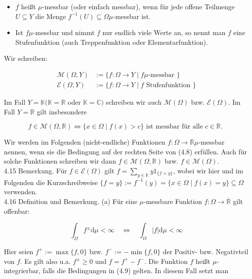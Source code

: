 \documentclass[10pt, letterpaper]{article}
\begin{document}
\begin{itemize}
  \item $f$ heißt $\mu$-messbar (oder einfach messbar), wenn für jede offene Teilmenge $U \subseteq Y$ die Menge $f^{-1}(U) \subseteq \Omega \mu$-messbar ist.
  \item Ist $f \mu$-messbar und nimmt $f$ nur endlich viele Werte an, so nennt man $f$ eine Stufenfunktion (auch Treppenfunktion oder Elementarfunktion).
\end{itemize}

Wir schreiben:

$$
\begin{aligned}
\mathcal{M}(\Omega, Y) & :=\{f: \Omega \rightarrow Y \mid f \mu \text {-messbar }\} \\
\mathcal{E}(\Omega, Y) & :=\{f: \Omega \rightarrow Y \mid f \text { Stufenfunktion }\}
\end{aligned}
$$

Im Fall $Y=\mathbb{K}(\mathbb{K}=\mathbb{R}$ oder $\mathbb{K}=\mathbb{C})$ schreiben wir auch $\mathcal{M}(\Omega)$ bzw. $\mathcal{E}(\Omega)$. Im Fall $Y=\mathbb{R}$ gilt insbesondere

$$
f \in \mathcal{M}(\Omega, \mathbb{R}) \Longleftrightarrow\{x \in \Omega \mid f(x)>c\} \text { ist messbar für alle } c \in \mathbb{R} \text {. }
$$

Wir werden im Folgenden (nicht-endliche) Funktionen $f: \Omega \rightarrow \overline{\mathbb{R}} \mu$-messbar nennen, wenn sie die Bedingung auf der rechten Seite von (4.8) erfüllen. Auch für solche Funktionen schreiben wir dann $f \in \mathcal{M}(\Omega, \mathbb{R})$ bzw. $f \in \mathcal{M}(\Omega)$.\\
4.15 Bemerkung. Für $f \in \mathcal{E}(\Omega)$ gilt $f=\sum_{y \in \mathbb{K}} y 1_{\{f=y\}}$, wobei wir hier und im Folgenden die Kurzschreibweise $\{f=y\}:=f^{-1}(y)=\{x \in \Omega \mid f(x)=y\} \subseteq \Omega$ verwenden.\\
4.16 Definition und Bemerkung. (a) Für eine $\mu$-messbare Funktion $f: \Omega \rightarrow \overline{\mathbb{R}}$ gilt offenbar:

$$
\int_{\Omega} f^{ \pm} \mathrm{d} \mu<\infty \quad \Longleftrightarrow \quad \int_{\Omega}|f| \mathrm{d} \mu<\infty
$$

Hier seien $f^{+}:=\max \{f, 0\}$ bzw. $f^{-}:=-\min \{f, 0\}$ der Positiv- bzw. Negativteil von $f$. Es gilt also u.a. $f^{ \pm} \geq 0$ und $f=f^{+}-f^{-}$. Die Funktion $f$ heißt $\mu$-integrierbar, falls die Bedingungen in (4.9) gelten. In diesem Fall setzt man
\end{document}
